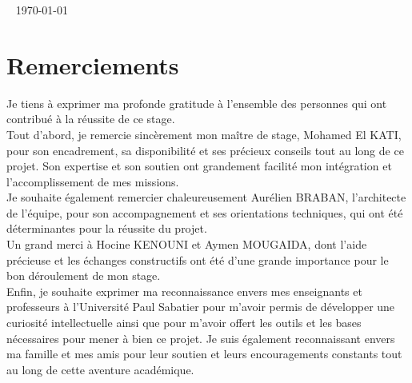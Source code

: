\documentclass[a4paper, 12pt]{report}
\begin{document}
 
\vfill{~}
\hfill{\today}


\chapter*{\textbf{Remerciements}}
Je tiens à exprimer ma profonde gratitude à l'ensemble des personnes qui ont contribué à la réussite de ce stage.\\

Tout d'abord, je remercie sincèrement mon maître de stage, Mohamed El KATI, pour son encadrement, sa disponibilité et ses précieux conseils tout au long de ce projet. Son expertise et son soutien ont grandement facilité mon intégration et l'accomplissement de mes missions.\\

Je souhaite également remercier chaleureusement Aurélien BRABAN, l'architecte de l'équipe, pour son accompagnement et ses orientations techniques, qui ont été déterminantes pour la réussite du projet.\\

Un grand merci à Hocine KENOUNI et Aymen MOUGAIDA, dont l'aide précieuse et les échanges constructifs ont été d'une grande importance pour le bon déroulement de mon stage.\\

Enfin, je souhaite exprimer ma reconnaissance envers mes enseignants et professeurs à l’Université Paul Sabatier pour m’avoir permis de développer une curiosité intellectuelle ainsi que pour m’avoir offert les outils et les bases nécessaires pour mener à bien ce projet. Je suis également reconnaissant envers ma famille et mes amis pour leur soutien et leurs encouragements constants tout au long de cette aventure académique.\\
\end{document}
